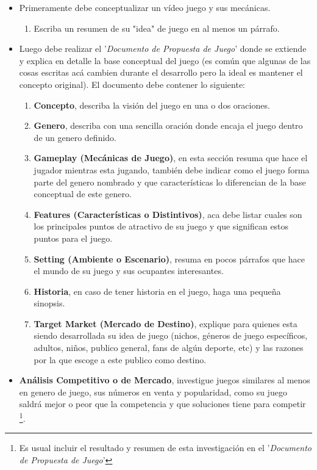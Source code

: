 \begin{itemize}
\item Primeramente debe conceptualizar un vídeo juego y sus mecánicas.
\begin{enumerate}
  \item Escriba un resumen de su "idea" de juego en al menos un párrafo.
\end{enumerate}
\item Luego debe realizar el '\emph{Documento de Propuesta de Juego}' donde se extiende y explica en detalle la base conceptual del juego (es común que algunas de las cosas escritas acá cambien durante el desarrollo pero la ideal es mantener el concepto original). El documento debe contener lo siguiente:
\begin{enumerate}
  \item \textbf{Concepto}, describa la visión del juego en una o dos oraciones.
  \item \textbf{Genero}, describa con una sencilla oración donde encaja el juego dentro de un genero definido.
  \item \textbf{Gameplay (Mecánicas de Juego)}, en esta sección resuma que hace el jugador mientras esta jugando, también debe indicar como el juego forma parte del genero nombrado y que características lo diferencian de la base conceptual de este genero.
  \item \textbf{Features (Características o Distintivos)}, aca debe listar cuales son los principales puntos de atractivo de su juego y que significan estos puntos para el juego.
  \item \textbf{Setting (Ambiente o Escenario)}, resuma en pocos párrafos que hace el mundo de su juego y sus ocupantes interesantes.
  \item \textbf{Historia}, en caso de tener historia en el juego, haga una pequeña sinopsis.
  \item \textbf{Target Market (Mercado de Destino)}, explique para quienes esta siendo desarrollada su idea de juego (nichos, géneros de juego específicos, adultos, niños, publico general, fans de algún deporte, etc) y las razones por la que escoge a este publico como destino.
\end{enumerate}
\item \textbf{Análisis Competitivo o de Mercado}, investigue juegos similares al menos en genero de juego, sus números en venta y popularidad, como su juego saldrá mejor o peor que la competencia y que soluciones tiene para competir \footnote{Es usual incluir el resultado y resumen de esta investigación en el '\emph{Documento de Propuesta de Juego}'}.

\end{itemize}
